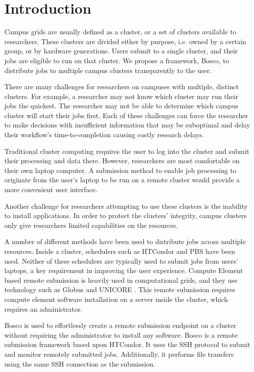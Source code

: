 \label{chapter:campusjobs} 
\section{Introduction}

Campus grids are usually defined as a cluster, or a set of clusters available to researchers.  These clusters are divided either by purpose, i.e. owned by a certain group, or by hardware generations.  Users submit to a single cluster, and their jobs are eligible to run on that cluster.  We propose a framework, Bosco, to distribute jobs to multiple campus clusters transparently to the user. 

There are many challenges for researchers on campuses with multiple, distinct clusters.  For example, a researcher may not know which cluster may run their jobs the quickest.  The researcher may not be able to determine which campus cluster will start their jobs first.  Each of these challenges can force the researcher to make decisions with insufficient information that may be suboptimal and delay their workflow's time-to-completion causing costly research delays.

Traditional cluster computing requires the user to log into the cluster and submit their processing and data there. However, researchers are most comfortable on their own laptop computer.  A submission method to enable job processing to originate from the user's laptop to be run on a remote cluster would provide a more convenient user interface.

Another challenge for researchers attempting to use these clusters is the inability to install applications.  In order to protect the clusters' integrity, campus clusters only give researchers limited capabilities on the resources.

A number of different methods have been used to distribute jobs across multiple resources.  Inside a cluster, schedulers such as HTCondor  \cite{litzkow1988condor} and PBS \cite{henderson1995job} have been used.  Neither of these schedulers are typically used to submit jobs from users' laptops, a key requirement in improving the user experience.  Compute Element based remote submission is heavily used in computational grids, and they use technology such as Globus \cite{foster2001globus} and UNICORE \cite{romberg2002unicore}. This remote submission requires compute element software installation on a server inside the cluster, which requires an administrator.

Bosco \cite{weitzel2014accessing} is used to effortlessly create a remote submission endpoint on a cluster without requiring the administrator to install any software.  Bosco is a remote submission framework based upon HTCondor.  It uses the SSH \cite{ylonen2006secure} protocol to submit and monitor remotely submitted jobs.  Additionally, it performs file transfers using the same SSH connection as the submission.

